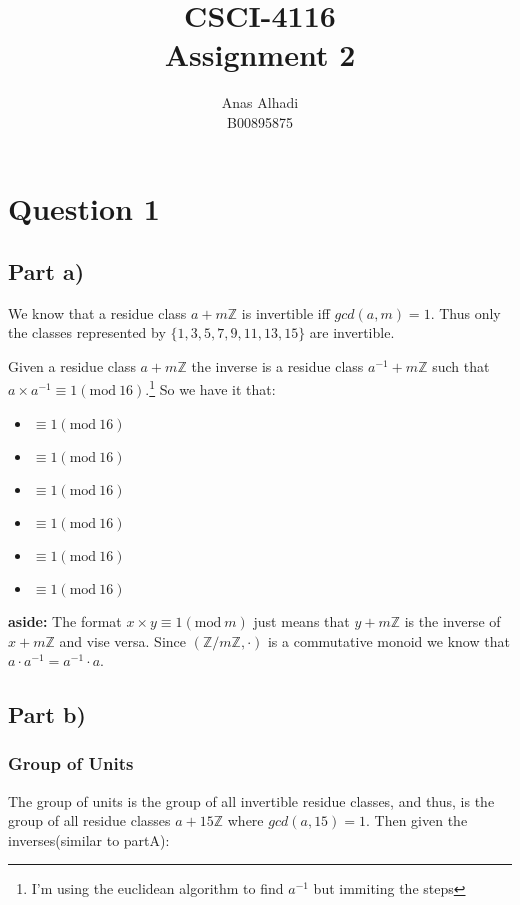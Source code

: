 \documentclass{article}
\title{\textbf{CSCI-4116\\Assignment 2}}
\author{Anas Alhadi\\B00895875}
\numberwithin{equation}{subsection}
\begin{document}
	\maketitle

	

	\vspace{25pt}
	\section*{Question 1}
	\subsection*{Part a)}	
	\par{
		We know that a residue class $a+m\mathbb{Z}$ is invertible iff $gcd(a,m)=1$.
		Thus only the classes represented by $\{1,3,5,7,9,11,13,15\}$ are invertible.}
	\par{
		Given a residue class $a+m\mathbb{Z}$ the inverse is a residue class 
		$a^{-1}+m\mathbb{Z}$ such that $a \times a^{-1} \equiv 1(\textrm{mod}\ 16)$.\footnote{I'm using the euclidean algorithm 
		to find $a^{-1}$ but immiting the steps}
		So we have it that:
	}

	\begin{itemize}[]
		\item{}  $\equiv 1(\textrm{mod}\ 16)$	
		\item{}  $\equiv 1(\textrm{mod}\ 16)$	
		\item{}  $\equiv 1(\textrm{mod}\ 16)$	
		\item{}  $\equiv 1(\textrm{mod}\ 16)$	
		\item{}  $\equiv 1(\textrm{mod}\ 16)$	
		\item{}  $\equiv 1(\textrm{mod}\ 16)$	
	\end{itemize}

	\textbf{aside:}
	The format $x \times y \equiv 1(\textrm{mod}\ m)$ just means that
	$y+m\mathbb{Z}$ is the inverse of $x+m\mathbb{Z}$ and vise versa. Since $(\mathbb{Z}/m\mathbb{Z}, \cdot)$ is a commutative monoid
	we know that $a\cdot a^{-1} = a^{-1}\cdot a$.

	\vspace{15pt}
	\subsection*{Part b)}
	\subsubsection*{Group of Units}
	The group of units is the group of all invertible residue classes, and thus, is the 
	group of all residue classes $a+15\mathbb{Z}$ where $gcd(a,15)=1$. Then given the inverses(similar to partA):
	
\end{document}

